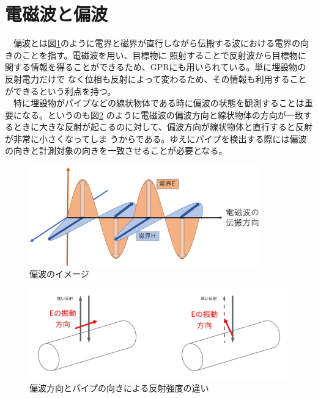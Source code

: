 \documentclass[12pt,a4paper]{jsreport}
\begin{document}
\section{電磁波と偏波}
　偏波とは図\ref{偏波のイメージ}のように電界と磁界が直行しながら伝搬する波における電界の向きのことを指す。電磁波を用い、目標物に
照射することで反射波から目標物に関する情報を得ることができるため、GPRにも用いられている。単に埋設物の反射電力だけで
なく位相も反射によって変わるため、その情報も利用することができるという利点を持つ。
\\　特に埋設物がパイプなどの線状物体である時に偏波の状態を観測することは重要になる。というのも図\ref{偏波方向とパイプの向きによる反射強度の違い}
のように電磁波の偏波方向と線状物体の方向が一致するときに大きな反射が起こるのに対して、偏波方向が線状物体と直行すると反射が非常に小さくなってしま
うからである。ゆえにパイプを検出する際には偏波の向きと計測対象の向きを一致させることが必要となる。
\begin{figure}[h]
  \begin{center}
   \includegraphics[width=10cm]{./image/wave_propagation.png}
  \caption{偏波のイメージ}\label{偏波のイメージ}
  \end{center}
  \end{figure}

  \begin{figure}[h]
    \begin{center}
     \includegraphics[width=13cm]{./image/polarization.pdf}
    \caption{偏波方向とパイプの向きによる反射強度の違い}\label{偏波方向とパイプの向きによる反射強度の違い}
    \end{center}
    \end{figure}
\end{document}
